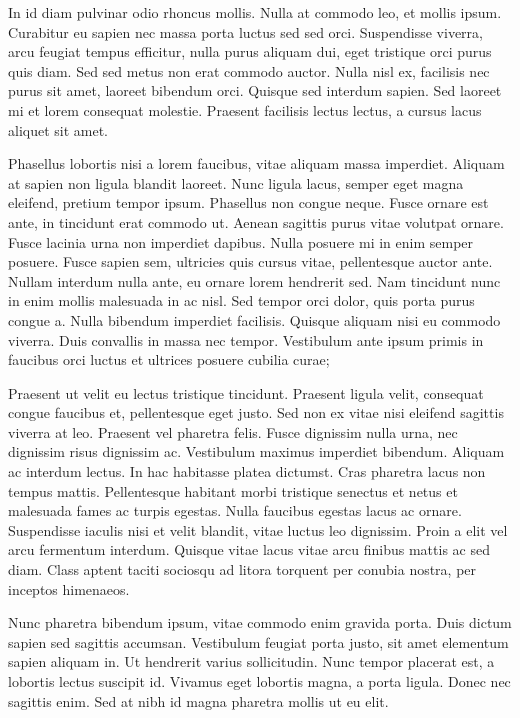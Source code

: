 In id diam pulvinar odio rhoncus mollis. Nulla at commodo leo, et mollis ipsum. Curabitur eu sapien nec massa porta luctus sed sed orci. Suspendisse viverra, arcu feugiat tempus efficitur, nulla purus aliquam dui, eget tristique orci purus quis diam. Sed sed metus non erat commodo auctor. Nulla nisl ex, facilisis nec purus sit amet, laoreet bibendum orci. Quisque sed interdum sapien. Sed laoreet mi et lorem consequat molestie. Praesent facilisis lectus lectus, a cursus lacus aliquet sit amet.

Phasellus lobortis nisi a lorem faucibus, vitae aliquam massa imperdiet. Aliquam at sapien non ligula blandit laoreet. Nunc ligula lacus, semper eget magna eleifend, pretium tempor ipsum. Phasellus non congue neque. Fusce ornare est ante, in tincidunt erat commodo ut. Aenean sagittis purus vitae volutpat ornare. Fusce lacinia urna non imperdiet dapibus. Nulla posuere mi in enim semper posuere. Fusce sapien sem, ultricies quis cursus vitae, pellentesque auctor ante. Nullam interdum nulla ante, eu ornare lorem hendrerit sed. Nam tincidunt nunc in enim mollis malesuada in ac nisl. Sed tempor orci dolor, quis porta purus congue a. Nulla bibendum imperdiet facilisis. Quisque aliquam nisi eu commodo viverra. Duis convallis in massa nec tempor. Vestibulum ante ipsum primis in faucibus orci luctus et ultrices posuere cubilia curae;

Praesent ut velit eu lectus tristique tincidunt. Praesent ligula velit, consequat congue faucibus et, pellentesque eget justo. Sed non ex vitae nisi eleifend sagittis viverra at leo. Praesent vel pharetra felis. Fusce dignissim nulla urna, nec dignissim risus dignissim ac. Vestibulum maximus imperdiet bibendum. Aliquam ac interdum lectus. In hac habitasse platea dictumst. Cras pharetra lacus non tempus mattis. Pellentesque habitant morbi tristique senectus et netus et malesuada fames ac turpis egestas. Nulla faucibus egestas lacus ac ornare. Suspendisse iaculis nisi et velit blandit, vitae luctus leo dignissim. Proin a elit vel arcu fermentum interdum. Quisque vitae lacus vitae arcu finibus mattis ac sed diam. Class aptent taciti sociosqu ad litora torquent per conubia nostra, per inceptos himenaeos.

Nunc pharetra bibendum ipsum, vitae commodo enim gravida porta. Duis dictum sapien sed sagittis accumsan. Vestibulum feugiat porta justo, sit amet elementum sapien aliquam in. Ut hendrerit varius sollicitudin. Nunc tempor placerat est, a lobortis lectus suscipit id. Vivamus eget lobortis magna, a porta ligula. Donec nec sagittis enim. Sed at nibh id magna pharetra mollis ut eu elit.

